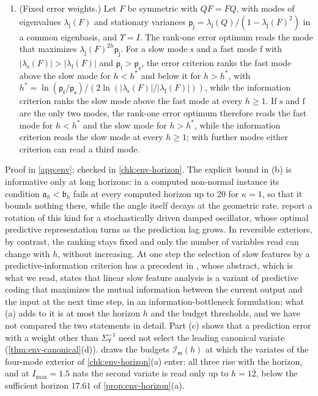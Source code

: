 \begin{proposition}
\begin{enumerate}
\item[(c)] (Fixed error weights.) Let $F$ be symmetric with $QF=FQ$, with modes of eigenvalues $\lambda_{\mathsf j}(F)$ and stationary variances $\mathsf p_{\mathsf j}=\lambda_{\mathsf j}(Q)/(1-\lambda_{\mathsf j}(F)^2)$ in a common eigenbasis, and $\Upsilon=I$. The rank-one error optimum reads the mode that maximizes $\lambda_{\mathsf j}(F)^{2h}\mathsf p_{\mathsf j}$. For a slow mode $\mathrm s$ and a fast mode $\mathrm f$ with $\lvert\lambda_{\mathrm s}(F)\rvert>\lvert\lambda_{\mathrm f}(F)\rvert$ and $\mathsf p_{\mathrm f}>\mathsf p_{\mathrm s}$, the error criterion ranks the fast mode above the slow mode for $h<h^\ast$ and below it for $h>h^\ast$, with $h^\ast=\ln(\mathsf p_{\mathrm f}/\mathsf p_{\mathrm s})/(2\ln(\lvert\lambda_{\mathrm s}(F)\rvert/\lvert\lambda_{\mathrm f}(F)\rvert))$, while the information criterion ranks the slow mode above the fast mode at every $h\ge1$. If $\mathrm s$ and $\mathrm f$ are the only two modes, the rank-one error optimum therefore reads the fast mode for $h<h^\ast$ and the slow mode for $h>h^\ast$, while the information criterion reads the slow mode at every $h\ge1$; with further modes either criterion can read a third mode.
\end{enumerate}
\end{proposition}

Proof in \cref{app:env}; checked in \cref{chk:env-horizon}. The explicit bound in (b) is informative only at long horizons: in a computed non-normal instance its condition $\mathfrak a_h<\mathfrak b_h$ fails at every computed horizon up to 20 for $\kappa=1$, so that it bounds nothing there, while the angle itself decays at the geometric rate.  report a rotation of this kind for a stochastically driven damped oscillator, whose optimal predictive representation turns as the prediction lag grows. In reversible exteriors, by contrast, the ranking stays fixed and only the number of variables read can change with $h$, without increasing. At one step the selection of slow features by a predictive-information criterion has a precedent in \citet{creutzig2008predictive}, whose abstract, which is what we read, states that linear slow feature analysis is a variant of predictive coding that maximizes the mutual information between the current output and the input at the next time step, in an information-bottleneck formulation; what (a) adds to it is at most the horizon $h$ and the budget thresholds, and we have not compared the two statements in detail. Part (c) shows that a prediction error with a weight other than $\Sigma_{\mathsf Y}^{-1}$ need not select the leading canonical variate (\cref{thm:env-canonical}(d)).  draws the budgets $\mathcal I_{\mathsf m}(h)$ at which the variates of the four-mode exterior of \cref{chk:env-horizon}(a) enter: all three rise with the horizon, and at $I_{\max}=1.5$ nats the second variate is read only up to $h=12$, below the sufficient horizon $17.61$ of \cref{prop:env-horizon}(a).

